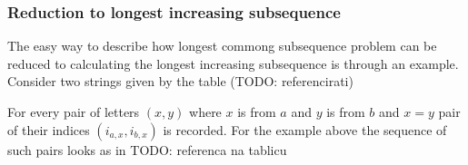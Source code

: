 \documentclass[times, utf8, diplomski]{fer}
\begin{document}
\subsubsection{Reduction to longest increasing subsequence}

The easy way to describe how longest commong subsequence problem can be reduced to calculating the longest increasing subsequence is through an example. Consider two strings given by the table (TODO: referencirati)

\begin{table}[H]
  \centering


  \caption{Example strings}\label{indeks}
\end{table}

For every pair of letters $(x,y)$ where $x$ is from $a$ and $y$ is from $b$ and $x=y$ pair of their indices $(i_{a,x}, i_{b,x})$ is recorded. For the example above the sequence of such pairs looks as in TODO: referenca na tablicu
\end{document}

